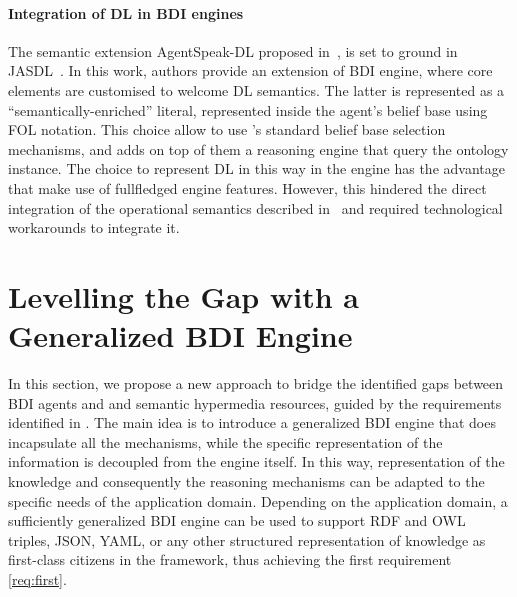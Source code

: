 \documentclass[
]{ceurart}
\begin{document}
\paragraph{Integration of DL in BDI engines}
The semantic extension AgentSpeak-DL proposed in~\cite{DBLP:conf/dalt/MoreiraVBH05}, 
is set to ground in JASDL~\cite{DBLP:conf/dalt/KlapiscakB08}.
%
In this work, 
authors provide an extension of \jason{} \ac{BDI} engine, 
where core elements are customised to welcome \ac{DL} semantics.
%
The latter is represented as a ``semantically-enriched'' literal,
represented inside the agent's belief base using FOL notation.
%
This choice allow to use \jason{}'s standard belief base selection mechanisms, 
and adds on top of them a reasoning engine that query the ontology instance.
%
The choice to represent \ac{DL} in this way in the engine has the advantage that make use of fullfledged \jason{} engine features.
%
However, 
this hindered the direct integration of the operational semantics described in~\cite{DBLP:conf/dalt/KlapiscakB08} 
and required technological workarounds to integrate it.
%


\section{Levelling the Gap with a Generalized BDI Engine}
\label{sec:generalized-bdi-engine}

In this section,
we propose a new approach to bridge the identified gaps between \ac{BDI} agents and and semantic hypermedia resources,
guided by the requirements identified in .
%
The main idea is to introduce a generalized \ac{BDI} engine that does incapsulate all the \agentspeak{} mechanisms,
while the specific representation of the information is decoupled from the engine itself.
%
In this way,
representation of the knowledge and consequently the reasoning mechanisms 
can be adapted to the specific needs of the application domain.
%
Depending on the application domain,
a sufficiently generalized \ac{BDI} engine can be used to support 
\ac{RDF} and \ac{OWL} triples, JSON, YAML, or any other structured representation of knowledge as first-class citizens in the framework,
thus achieving the first requirement \ref{req:first}.
\end{document}
